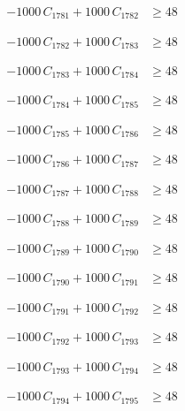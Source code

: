\documentclass[a4paper,11pt]{article}
\begin{document}
\begin{align}
-1000\,C_{1781} + 1000\,C_{1782} &\geq 48 \nonumber
\end{align}

\begin{align}
-1000\,C_{1782} + 1000\,C_{1783} &\geq 48 \nonumber
\end{align}

\begin{align}
-1000\,C_{1783} + 1000\,C_{1784} &\geq 48 \nonumber
\end{align}

\begin{align}
-1000\,C_{1784} + 1000\,C_{1785} &\geq 48 \nonumber
\end{align}

\begin{align}
-1000\,C_{1785} + 1000\,C_{1786} &\geq 48 \nonumber
\end{align}

\begin{align}
-1000\,C_{1786} + 1000\,C_{1787} &\geq 48 \nonumber
\end{align}

\begin{align}
-1000\,C_{1787} + 1000\,C_{1788} &\geq 48 \nonumber
\end{align}

\begin{align}
-1000\,C_{1788} + 1000\,C_{1789} &\geq 48 \nonumber
\end{align}

\begin{align}
-1000\,C_{1789} + 1000\,C_{1790} &\geq 48 \nonumber
\end{align}

\begin{align}
-1000\,C_{1790} + 1000\,C_{1791} &\geq 48 \nonumber
\end{align}

\begin{align}
-1000\,C_{1791} + 1000\,C_{1792} &\geq 48 \nonumber
\end{align}

\begin{align}
-1000\,C_{1792} + 1000\,C_{1793} &\geq 48 \nonumber
\end{align}

\begin{align}
-1000\,C_{1793} + 1000\,C_{1794} &\geq 48 \nonumber
\end{align}

\begin{align}
-1000\,C_{1794} + 1000\,C_{1795} &\geq 48 \nonumber
\end{align}
\end{document}
